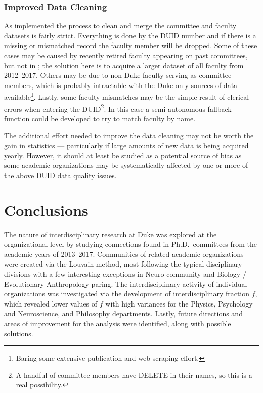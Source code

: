 \documentclass[notitlepage,aps,prd,nofootinbib]{revtex4-1}
\begin{document}
\subsubsection{Improved Data Cleaning}
As implemented the process to clean and merge the committee and faculty datasets is fairly strict. Everything is done by the DUID number and if there is a missing or mismatched record the faculty member will be dropped. Some of these cases may be caused by recently retired faculty appearing on past committees, but not in ; the solution here is to acquire a larger dataset of all faculty from 2012--2017. Others may be due to non-Duke faculty serving as committee members, which is probably intractable with the Duke only sources of data available\footnote{Baring some extensive publication and web scraping effort.}. Lastly, some faculty mismatches may be the simple result of clerical errors when entering the DUID\footnote{A handful of committee members have DELETE in their names, so this is a real possibility.}. In this case a semi-autonomous fallback function could be developed to try to match faculty by name.

The additional effort needed to improve the data cleaning may not be worth the gain in statistics --- particularly if large amounts of new data is being acquired yearly. However, it should at least be studied as a potential source of bias as some academic organizations may be systematically affected by one or more of the above DUID data quality issues.


\section{Conclusions}
The nature of interdisciplinary research at Duke was explored at the organizational level by studying connections found in Ph.D.\ committees from the academic years of 2013--2017. Communities of related academic organizations were created via the Louvain method, most following the typical disciplinary divisions with a few interesting exceptions in Neuro community and Biology / Evolutionary Anthropology paring. The interdisciplinary activity of individual organizations was investigated via the development of interdisciplinary fraction $f$, which revealed lower values of $f$ with high variances for the Physics, Psychology and Neuroscience, and Philosophy departments. Lastly, future directions and areas of improvement for the analysis were identified, along with possible solutions.
\end{document}
